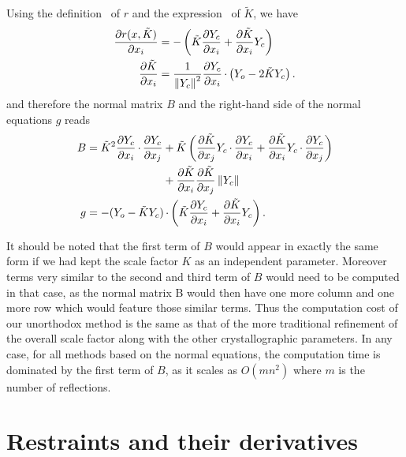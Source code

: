 \documentclass[pdf]{iucr}
\begin{document}
Using the definition~ of $r$ and the expression~ of $\tilde{K}$, we have
\begin{align}
\frac{\partial r(x, \tilde{K})}{\partial x_i} &= -\left( \tilde{K}\frac{\partial Y_c}{\partial x_i} + \frac{\partial \tilde{K}}{\partial x_i} Y_c \right) \\
\frac{\partial \tilde{K}}{\partial x_i} &= \frac{1}{\left\| Y_c \right\|^2}\frac{\partial Y_c}{\partial x_i} \operatorname{\cdot} \left(Y_o - 2 \tilde{K}Y_c \right).
\end{align}
and therefore the normal matrix $B$ and the right-hand side of the normal equations $g$ reads
\begin{align}
B &= \begin{aligned}[t] \tilde{K}^2\frac{\partial Y_c}{\partial x_i} \operatorname{\cdot} \frac{\partial Y_c}{\partial x_j} 
&+ \tilde{K} \left( \frac{\partial \tilde{K}}{\partial x_j}Y_c \operatorname{\cdot} \frac{\partial Y_c}{\partial x_i}
+ \frac{\partial \tilde{K}}{\partial x_i}Y_c \operatorname{\cdot} \frac{\partial Y_c}{\partial x_j} \right) \nonumber\\
&+ \frac{\partial \tilde{K}}{\partial x_i}\frac{\partial \tilde{K}}{\partial x_j} \left\| Y_c \right\|
\end{aligned}
\\
g &= - (Y_o - \tilde{K}Y_c) \operatorname{\cdot} \left( \tilde{K}\frac{\partial Y_c}{\partial x_i} + \frac{\partial \tilde{K}}{\partial x_i} Y_c \right).
\end{align}

It should be noted that the first term of $B$ would appear in exactly the same form if we had kept the scale factor $K$ as an independent parameter. Moreover terms very similar to the second and third term of $B$ would need to be computed in that case, as the normal matrix B would then have one more column and one more row which would feature those similar terms. Thus the computation cost of our unorthodox method is the same as that of the more traditional refinement of the overall scale factor along with the other crystallographic parameters. In any case, for all methods based on the normal equations, the computation time is dominated by the first term of $B$, as it scales as $O(mn^2)$ where $m$ is the number of reflections.

\section{Restraints and their derivatives}
\end{document}
